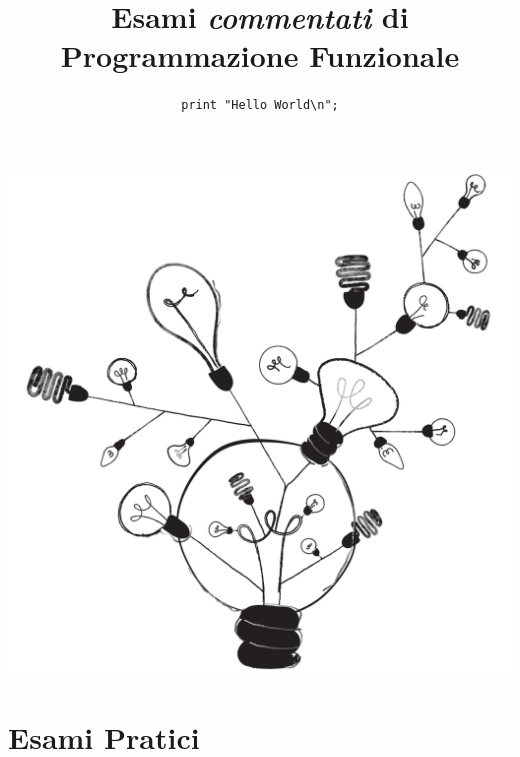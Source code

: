 \documentclass[a4paper, 10pt]{article}
\title{Esami \emph{commentati} di\\Programmazione Funzionale}
\subtitle{\texttt{print "Hello World{\textbackslash}n";}}
\begin{document}
\maketitle
\vfill
\includegraphics[width=.8\textwidth]{assets/figures/absurd-07}
\thispagestyle{empty}

\afterpage{\blankpage}
\clearpage

\pagestyle{pageReference}




\afterpage{\blankpage}
\clearpage




\clearpage

\part{Esami Pratici}

\afterpage{\blankpage}
\clearpage


\end{document}
